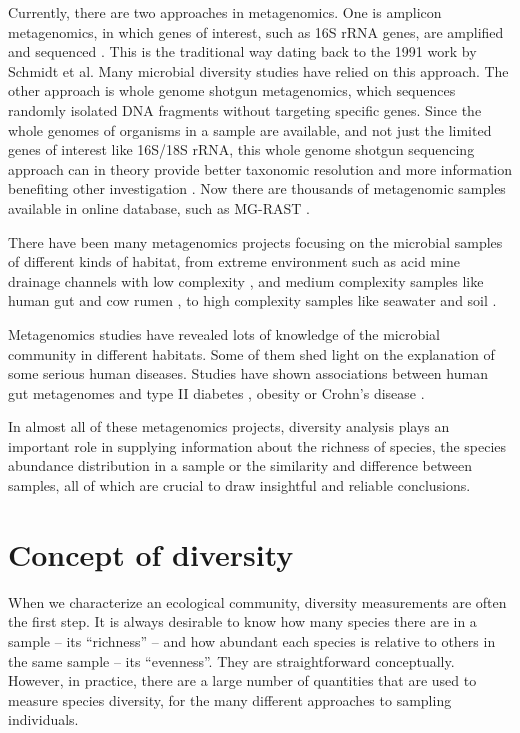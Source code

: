 Currently, there are two approaches in metagenomics. One is amplicon
metagenomics, in which genes of interest, such as 16S rRNA genes, are amplified
and sequenced \cite{Sogin:2006aa}. This is the traditional way dating back to
the 1991 work by Schmidt et al. Many microbial diversity studies have relied on
this approach. The other approach is whole genome shotgun metagenomics, which
sequences randomly isolated DNA fragments without targeting specific genes.
Since the whole genomes of organisms in a sample are available, and not just
the limited genes of interest like 16S/18S rRNA, this whole genome shotgun
sequencing approach can in theory provide better taxonomic resolution and more
information benefiting other investigation \cite{Tyson:2004aa}
\cite{Qin:2010aa}.  Now there are thousands of metagenomic samples available in
online database, such as MG-RAST \cite{Glass:2010aa}.

There have been many metagenomics projects focusing on the microbial samples of
different kinds of habitat, from extreme environment such as acid mine drainage
channels with low complexity \cite{Tyson:2004aa}, and medium complexity samples
like human gut \cite{Qin:2010aa} and cow rumen \cite{Hess:2011aa}, to high
complexity samples like seawater \cite{Venter:2004aa} and soil
\cite{Gilbert:2010aa}.

Metagenomics studies have revealed lots of knowledge of the microbial community in
different habitats. Some of them shed light on the explanation of some serious
human diseases. Studies have shown associations between human gut metagenomes
and type II diabetes \cite{Qin:2012aa}, obesity \cite{Turnbaugh:2009aa,
Kau:2011aa} or Crohn's disease \cite{Morgan:2012aa}.

In almost all of these metagenomics projects, diversity analysis plays an
important role in supplying information about the richness of species, the
species abundance distribution in a sample or the similarity and difference
between samples, all of which are crucial to draw insightful and reliable
conclusions.




\section{Concept of diversity} When we characterize an ecological community,
diversity measurements are often the first step. It is always desirable to know
how many species there are in a sample -- its ``richness'' -- and how abundant
each species is relative to others in the same sample -- its ``evenness''. They
are straightforward conceptually. However, in practice, there are a large number of
quantities that are used to measure species diversity, for the many different
approaches to sampling individuals.

